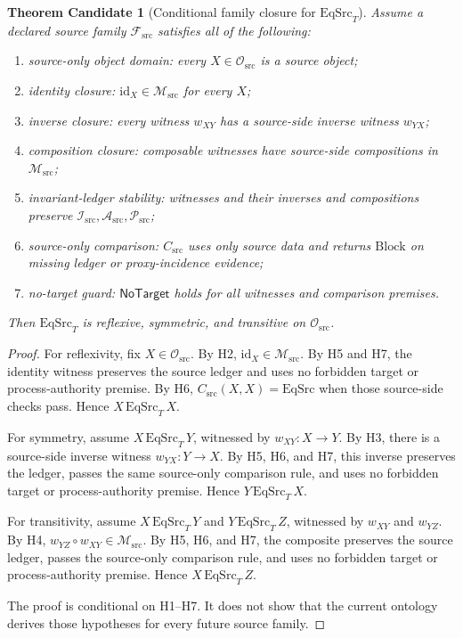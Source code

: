 \documentclass[11pt]{article}
\newcommand{\EqSrc}{\mathrm{EqSrc}}
\newcommand{\EqSrcT}{\mathrm{EqSrc}_{T}}
\newcommand{\Block}{\mathrm{Block}}
\newcommand{\Fsrc}{\mathcal{F}_{\mathrm{src}}}
\newcommand{\Osrc}{\mathcal{O}_{\mathrm{src}}}
\newcommand{\Msrc}{\mathcal{M}_{\mathrm{src}}}
\newcommand{\Isrc}{\mathcal{I}_{\mathrm{src}}}
\newcommand{\Asrc}{\mathcal{A}_{\mathrm{src}}}
\newcommand{\Psrc}{\mathcal{P}_{\mathrm{src}}}
\newcommand{\Csrc}{C_{\mathrm{src}}}
\newcommand{\NoTarget}{\mathsf{NoTarget}}
\newtheorem{theorem}{Theorem Candidate}
\begin{document}
\begin{theorem}[Conditional family closure for \(\EqSrcT\)]
Assume a declared source family \(\Fsrc\) satisfies all of the following:
\begin{enumerate}[label=(H\arabic*)]
  \item source-only object domain: every \(X\in\Osrc\) is a source object;
  \item identity closure: \(\mathrm{id}_{X}\in\Msrc\) for every \(X\);
  \item inverse closure: every witness \(w_{XY}\) has a source-side inverse
  witness \(w_{YX}\);
  \item composition closure: composable witnesses have source-side
  compositions in \(\Msrc\);
  \item invariant-ledger stability: witnesses and their inverses and
  compositions preserve \(\Isrc,\Asrc,\Psrc\);
  \item source-only comparison: \(\Csrc\) uses only source data and returns
  \(\Block\) on missing ledger or proxy-incidence evidence;
  \item no-target guard: \(\NoTarget\) holds for all witnesses and comparison
  premises.
\end{enumerate}
Then \(\EqSrcT\) is reflexive, symmetric, and transitive on \(\Osrc\).
\end{theorem}

\begin{proof}
For reflexivity, fix \(X\in\Osrc\). By H2, \(\mathrm{id}_{X}\in\Msrc\).
By H5 and H7, the identity witness preserves the source ledger and uses no
forbidden target or process-authority premise. By H6, \(\Csrc(X,X)=\EqSrc\)
when those source-side checks pass. Hence \(X\,\EqSrcT\,X\).

For symmetry, assume \(X\,\EqSrcT\,Y\), witnessed by
\(w_{XY}:X\to Y\). By H3, there is a source-side inverse witness
\(w_{YX}:Y\to X\). By H5, H6, and H7, this inverse preserves the ledger,
passes the same source-only comparison rule, and uses no forbidden target or
process-authority premise. Hence \(Y\,\EqSrcT\,X\).

For transitivity, assume \(X\,\EqSrcT\,Y\) and \(Y\,\EqSrcT\,Z\), witnessed by
\(w_{XY}\) and \(w_{YZ}\). By H4, \(w_{YZ}\circ w_{XY}\in\Msrc\). By H5, H6,
and H7, the composite preserves the source ledger, passes the source-only
comparison rule, and uses no forbidden target or process-authority premise.
Hence \(X\,\EqSrcT\,Z\).

The proof is conditional on H1--H7. It does not show that the current ontology
derives those hypotheses for every future source family.
\end{proof}
\end{document}
